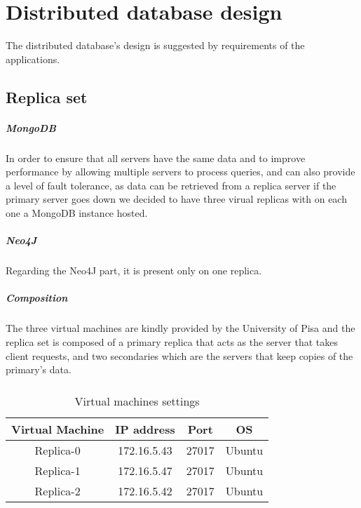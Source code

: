 \chapter{Distributed database design}

The distributed database's design is suggested by requirements of the applications.

\section{Replica set}

\paragraph{MongoDB}In order to ensure that all servers have the same data and to improve performance by allowing multiple servers to process queries, and can also provide a level of fault tolerance, as data can be retrieved from a replica server if the primary server goes down we decided to have three virual replicas with on each one a MongoDB instance hosted.

\paragraph{Neo4J}Regarding the Neo4J part, it is present only on one replica.

\paragraph{Composition} The three virtual machines are kindly provided by the University of Pisa and the replica set is composed of a primary replica that acts as the server that takes client requests, and two secondaries which are the servers that keep copies of the primary's data.

\paragraph{}

\begin{table} [H]
	\begin{center}
\begin{tabular}{|c|c|c|c|}
	\hline
	Virtual Machine & IP address & Port & OS \\
	\hline \hline
	Replica-0& 172.16.5.43 & 27017 &Ubuntu  \\
	\hline
	Replica-1& 172.16.5.47 & 27017 &Ubuntu  \\
	\hline
	Replica-2& 172.16.5.42 & 27017 &Ubuntu  \\
	\hline
\end{tabular}
\end{center}
\caption{\label{demo-table}Virtual machines settings}
\end{table}


